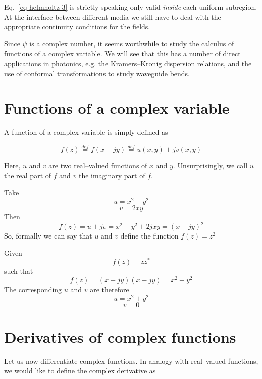 Eq.~\ref{eq-helmholtz-3} is strictly speaking only valid \emph{inside} each
uniform subregion. At the interface between different media we still have to
deal with the appropriate continuity conditions for the fields.

Since $\psi$ is a complex number, it seems worthwhile to study the calculus of
functions of a complex variable. We will see that this has a number of direct
applications in photonics, e.g. the Kramers--Kronig dispersion relations, and
the use of conformal transformations to study waveguide bends.

\section{Functions of a complex variable}

A function of a complex variable is simply defined as

\begin{equation}
f(z) \stackrel{def}{=} f(x + j y) \stackrel{def}{=}  u(x,y) + j v(x,y)
\end{equation}

Here, $u$ and $v$ are two real--valued functions of $x$ and $y$. Unsurprisingly,
we call $u$ the real part of $f$ and $v$ the imaginary part of $f$.


\begin{sidebar}
\begin{exa}
Take
$$u = x^2 - y^2$$
$$v = 2 x y$$
Then
$$f(z) = u + j v = x^2 - y^2 +2j x y = (x + jy)^2$$
So, formally we can say that $u$ and $v$ define the function $f(z) = z^2$
\end{exa}
\end{sidebar}

\begin{sidebar}
\begin{exa}
Given
$$f(z) = z z^* $$
such that
$$f(z) = (x + jy)(x - jy) = x^2 + y^2$$
The corresponding $u$ and $v$ are therefore
$$u = x^2 + y^2$$
$$v = 0$$
\end{exa}
\end{sidebar}



\section{Derivatives of complex functions}

Let us now differentiate complex functions. In analogy with real--valued
functions, we would like to define the complex derivative as

